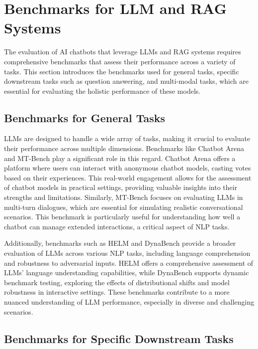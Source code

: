 \section{Benchmarks for LLM and RAG Systems}

The evaluation of AI chatbots that leverage LLMs and RAG systems requires comprehensive benchmarks that assess their performance across a variety of tasks. This section introduces the benchmarks used for general tasks, specific downstream tasks such as question answering, and multi-modal tasks, which are essential for evaluating the holistic performance of these models.

\subsection{Benchmarks for General Tasks}

LLMs are designed to handle a wide array of tasks, making it crucial to evaluate their performance across multiple dimensions. Benchmarks like Chatbot Arena \cite{lmsys2024arena} and MT-Bench \cite{zheng2024judging} play a significant role in this regard. Chatbot Arena offers a platform where users can interact with anonymous chatbot models, casting votes based on their experiences. This real-world engagement allows for the assessment of chatbot models in practical settings, providing valuable insights into their strengths and limitations. Similarly, MT-Bench focuses on evaluating LLMs in multi-turn dialogues, which are essential for simulating realistic conversational scenarios. This benchmark is particularly useful for understanding how well a chatbot can manage extended interactions, a critical aspect of NLP tasks.

Additionally, benchmarks such as HELM \cite{liang2022holistic} and DynaBench \cite{kiela2021dynabench} provide a broader evaluation of LLMs across various NLP tasks, including language comprehension and robustness to adversarial inputs. HELM offers a comprehensive assessment of LLMs' language understanding capabilities, while DynaBench supports dynamic benchmark testing, exploring the effects of distributional shifts and model robustness in interactive settings. These benchmarks contribute to a more nuanced understanding of LLM performance, especially in diverse and challenging scenarios.

\subsection{Benchmarks for Specific Downstream Tasks}

